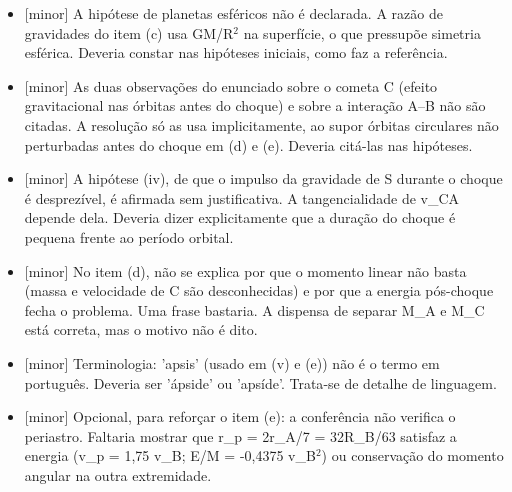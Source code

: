 \documentclass{article}%
\begin{document}
\begin{itemize}%
\item%
{[}minor{]} A hipótese de planetas esféricos não é declarada. A razão de gravidades do item (c) usa GM/R$^2$ na superfície, o que pressupõe simetria esférica. Deveria constar nas hipóteses iniciais, como faz a referência.%
\item%
{[}minor{]} As duas observações do enunciado sobre o cometa C (efeito gravitacional nas órbitas antes do choque) e sobre a interação A--B não são citadas. A resolução só as usa implicitamente, ao supor órbitas circulares não perturbadas antes do choque em (d) e (e). Deveria citá{-}las nas hipóteses.%
\item%
{[}minor{]} A hipótese (iv), de que o impulso da gravidade de S durante o choque é desprezível, é afirmada sem justificativa. A tangencialidade de v\_CA depende dela. Deveria dizer explicitamente que a duração do choque é pequena frente ao período orbital.%
\item%
{[}minor{]} No item (d), não se explica por que o momento linear não basta (massa e velocidade de C são desconhecidas) e por que a energia pós{-}choque fecha o problema. Uma frase bastaria. A dispensa de separar M\_A e M\_C está correta, mas o motivo não é dito.%
\item%
{[}minor{]} Terminologia: 'apsis' (usado em (v) e (e)) não é o termo em português. Deveria ser 'ápside' ou 'apsíde'. Trata{-}se de detalhe de linguagem.%
\item%
{[}minor{]} Opcional, para reforçar o item (e): a conferência não verifica o periastro. Faltaria mostrar que r\_p = 2r\_A/7 = 32R\_B/63 satisfaz a energia (v\_p = 1,75 v\_B; E/M = -0,4375 v\_B$^2$) ou conservação do momento angular na outra extremidade.%
\end{itemize}%
\end{document}
